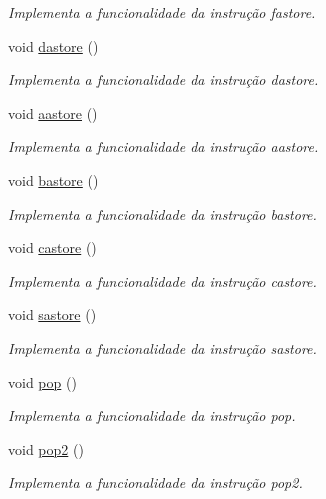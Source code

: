 \begin{DoxyCompactItemize}
\begin{DoxyCompactList}\small\item\em Implementa a funcionalidade da instrução fastore. \end{DoxyCompactList}\item 
void \hyperlink{classOperations_a9735fdb8ba4ea2d7b8b32e8d0a5d2f72}{dastore} ()
\begin{DoxyCompactList}\small\item\em Implementa a funcionalidade da instrução dastore. \end{DoxyCompactList}\item 
void \hyperlink{classOperations_a60b30bd84b2d59334e735f0adda6febe}{aastore} ()
\begin{DoxyCompactList}\small\item\em Implementa a funcionalidade da instrução aastore. \end{DoxyCompactList}\item 
void \hyperlink{classOperations_a6f0ded6d2fc9921a1418387527bec8f4}{bastore} ()
\begin{DoxyCompactList}\small\item\em Implementa a funcionalidade da instrução bastore. \end{DoxyCompactList}\item 
void \hyperlink{classOperations_a417c4833f2f048350920358961cfab03}{castore} ()
\begin{DoxyCompactList}\small\item\em Implementa a funcionalidade da instrução castore. \end{DoxyCompactList}\item 
void \hyperlink{classOperations_aab1c34c455478d75c21cdb06d6c94172}{sastore} ()
\begin{DoxyCompactList}\small\item\em Implementa a funcionalidade da instrução sastore. \end{DoxyCompactList}\item 
void \hyperlink{classOperations_a30b8a646cbfac3712f4b339364bd31b1}{pop} ()
\begin{DoxyCompactList}\small\item\em Implementa a funcionalidade da instrução pop. \end{DoxyCompactList}\item 
void \hyperlink{classOperations_a54e578f7f27df39f8c516ec93195e219}{pop2} ()
\begin{DoxyCompactList}\small\item\em Implementa a funcionalidade da instrução pop2. \end{DoxyCompactList}\item 

\end{DoxyCompactItemize}
